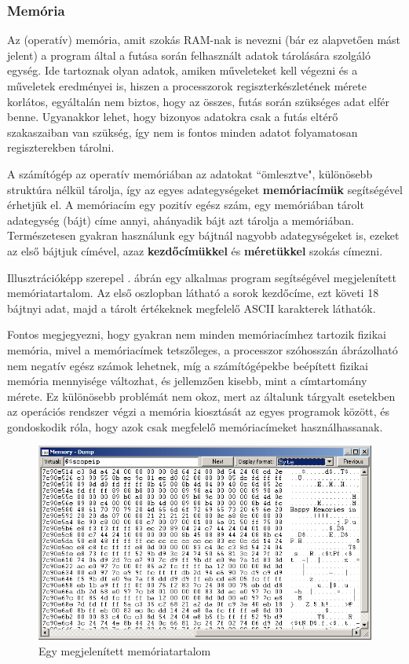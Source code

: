 \subsubsection{Memória}
Az (operatív) memória, amit szokás RAM-nak is nevezni (bár ez alapvetően mást jelent) a program által a futása során felhasznált adatok tárolására szolgáló egység. Ide tartoznak olyan adatok, amiken műveleteket kell végezni és a műveletek eredményei is, hiszen a processzorok regiszterkészletének mérete korlátos, egyáltalán nem biztos, hogy az összes, futás során szükséges adat elfér benne. Ugyanakkor lehet, hogy bizonyos adatokra csak a futás eltérő szakaszaiban van szükség, így nem is fontos minden adatot folyamatosan regiszterekben tárolni.

A számítógép az operatív memóriában az adatokat ``ömlesztve", különösebb struktúra nélkül tárolja, így az egyes adategységeket \textbf{memóriacímük} segítségével érhetjük el. A memóriacím egy pozitív egész szám, egy memóriában tárolt adategység (bájt) címe annyi, ahányadik bájt azt tárolja a memóriában. Természetesen gyakran használunk egy bájtnál nagyobb adategységeket is, ezeket az első bájtjuk címével, azaz \textbf{kezdőcímükkel} és \textbf{méretükkel} szokás címezni. 


Illusztrációképp szerepel . ábrán egy alkalmas program segítségével megjelenített memóriatartalom. Az első oszlopban látható a sorok kezdőcíme, ezt követi 18 bájtnyi adat, majd a tárolt értékeknek megfelelő ASCII karakterek láthatók.
 
Fontos megjegyezni, hogy gyakran nem minden memóriacímhez tartozik fizikai memória, mivel a memóriacímek tetszőleges, a processzor szóhosszán ábrázolható nem negatív egész számok lehetnek, míg a számítógépekbe beépített fizikai memória mennyisége változhat, és jellemzően kisebb, mint a címtartomány mérete. Ez különösebb problémát nem okoz, mert az általunk tárgyalt esetekben az operációs rendszer végzi a memória kiosztását az egyes programok között, és gondoskodik róla, hogy azok csak megfelelő memóriacímeket használhassanak.
\begin{figure}[htp] 
\begin{center}
  \includegraphics[scale=0.5]{figures/memory_dump.png}
  \caption[Egy memóriakép]{Egy megjelenített memóriatartalom}
  \label{memorydump}
\end{center}
\end{figure}

